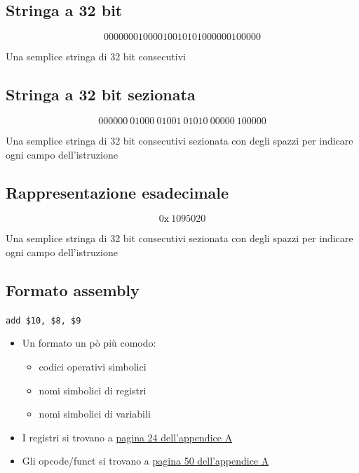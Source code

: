 \subsection{Stringa a 32 bit}
\begin{minipage}{0.5\textwidth}
    $$
        00000001000010010101000000100000
    $$
\end{minipage}
\hfil
\begin{minipage}{0.5\textwidth}
    Una semplice stringa di 32 bit consecutivi
\end{minipage}

\subsection{Stringa a 32 bit sezionata}
\begin{minipage}{0.5\textwidth}
    $$
        000000\ 01000\ 01001\ 01010\ 00000\ 100000
    $$
\end{minipage}
\hfil
\begin{minipage}{0.5\textwidth}
    Una semplice stringa di 32 bit consecutivi sezionata con degli spazzi per indicare ogni campo dell'istruzione
\end{minipage}

\subsection{Rappresentazione esadecimale}
\begin{minipage}{0.5\textwidth}
    $$
        0\texttt{x} \ 1 0 9 5 0 2 0
    $$
\end{minipage}
\hfil
\begin{minipage}{0.5\textwidth}
    Una semplice stringa di 32 bit consecutivi sezionata con degli spazzi per indicare ogni campo dell'istruzione
\end{minipage}

\subsection{Formato assembly}
\begin{minipage}{0.5\textwidth}
    \texttt{add \$10, \$8, \$9}
\end{minipage}
\hfil
\begin{minipage}{0.5\textwidth}
    \begin{itemize}
        \item Un formato un pò più comodo:
        \begin{itemize}
            \item codici operativi simbolici
            \item nomi simbolici di registri
            \item nomi simbolici di variabili
        \end{itemize}
        
        \item I registri si trovano a \uline{pagina 24 dell'appendice A}
        \item Gli opcode/funct si trovano a \uline{pagina 50 dell'appendice A}
    \end{itemize}
\end{minipage}

